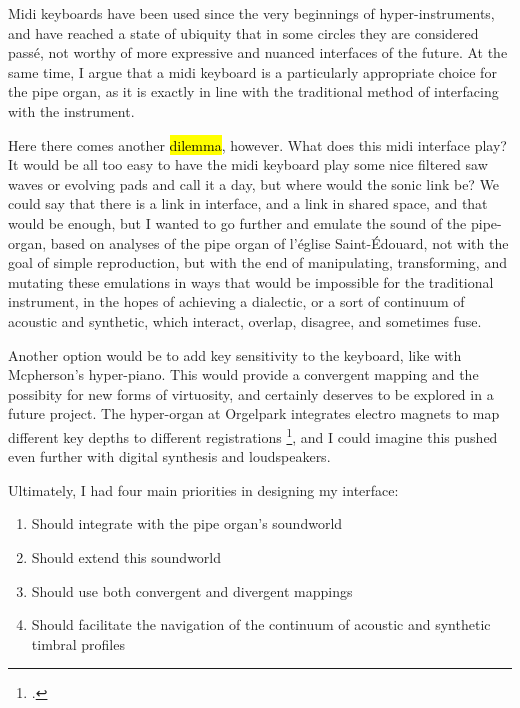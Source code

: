 \documentclass[12pt,twoside,maitrise]{dms_ks}
\theoremstyle{definition}
\begin{document}
{Midi keyboards have been used since the very beginnings of hyper-instruments, and have reached a state of ubiquity that in some circles they are considered passé, not worthy of more expressive and nuanced interfaces of the future.
At the same time, I argue that a midi keyboard is a particularly appropriate choice for the pipe organ, as it is exactly in line with the traditional method of interfacing with the instrument.

Here there comes another \hl{dilemma}, however.
What does this midi interface play?
It would be all too easy to have the midi keyboard play some nice filtered saw waves or evolving pads and call it a day, but where would the sonic link be?
We could say that there is a link in interface, and a link in shared space, and that would be enough, but I wanted to go further and emulate the sound of the pipe-organ, based on analyses of the pipe organ of l'église Saint-Édouard, not with the goal of simple reproduction, but with the end of manipulating, transforming, and mutating these emulations in ways that would be impossible for the traditional instrument, in the hopes of achieving a dialectic, or a sort of continuum of acoustic and synthetic, which interact, overlap, disagree, and sometimes fuse.


Another option would be to add key sensitivity to the keyboard, like with Mcpherson's hyper-piano. This would provide a convergent mapping and the possibity for new forms of virtuosity, and certainly deserves to be explored in a future project. The hyper-organ at Orgelpark integrates electro magnets to map different key depths to different registrations \footcite[14]{van_heumen_new_2014}, and I could imagine this pushed even further with digital synthesis and loudspeakers. 

Ultimately, I had four main priorities in designing my interface:

\begin{enumerate}
  \item Should integrate with the pipe organ's soundworld

  \item Should extend this soundworld
   
  \item Should use both convergent and divergent mappings

  \item Should facilitate the navigation of the continuum of acoustic
and synthetic timbral profiles
\end{enumerate}

}
\end{document}
